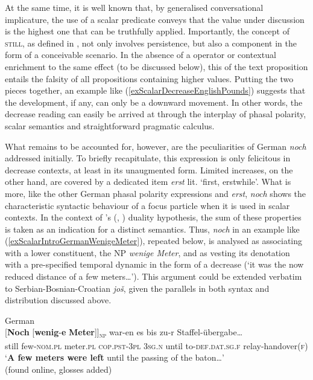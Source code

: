 At the same time, it is well known that,  by generalised conversational implicature, the use of a scalar predicate conveys that the value under discussion is the highest one that can be truthfully applied. Importantly, the concept of \textsc{still}, as defined in , not only involves persistence, but also a  component in the form of a conceivable  scenario. In the absence of a  operator or contextual enrichment to the same effect (to be discussed below), this  of the text proposition entails the falsity of all propositions containing higher values. Putting the two pieces together, an example like (\ref{exScalarDecreaseEnglishPounds}) suggests that the development, if any, can only be a downward movement. In other words, the decrease reading can easily be arrived at through the interplay of phasal polarity, scalar semantics and straightforward pragmatic calculus. 

What remains to be accounted for, however, are the peculiarities of German \textit{noch} addressed initially. To briefly recapitulate, this expression is only felicitous in decrease contexts, at least in its unaugmented form. Limited increases, on the other hand, are covered by a dedicated item \textit{erst} lit. \lq{}first, erstwhile\rq{}. What is more, like the other German phasal polarity expressions and  \textit{erst}, \textit{noch} shows the characteristic syntactic behaviour of a focus particle when it is used in scalar contexts. In the context of \citeauthor{Loebner1989}'s (\citeyear{Loebner1989}, \citeyear{Loebner1999}) duality hypothesis, the sum of these properties is taken as an indication for a distinct semantics. Thus, \textit{noch} in an example like (\ref{exScalarIntroGermanWenigeMeter}), repeated below, is analysed as associating with a lower constituent, the NP \textit{wenige Meter}, and as vesting its denotation with a pre-specified temporal dynamic in the form of a decrease (\approx{}\lq it was the now reduced distance of a few meters…\rq). This argument could be extended verbatim to Serbian-Bosnian-Croatian \textit{još}, given the parallels in both syntax and distribution discussed above.

\begin{exe}
German\\
\gll \textup{[}\textbf{Noch} \textup{[}\textbf{wenig}-\textbf{e} \textbf{Meter}\textup{]\textsubscript{}]\textsubscript{\textsc{np}}} war-en es bis zu-r Staffel-übergabe…\\
	\phantom{[}still \phantom{[}few-\textsc{nom}.\textsc{pl} meter.\textsc{pl} \textsc{cop}.\textsc{pst}-3\textsc{pl} 3\textsc{sg}.\textsc{n} until to-\textsc{def}.\textsc{dat}.\textsc{sg}.\textsc{f} relay-handover(\textsc{f})\\
	\glt \lq \textbf{A few meters were left} until the passing of the baton…\rq{}\\
	(found online, glosses added)
\end{exe}

